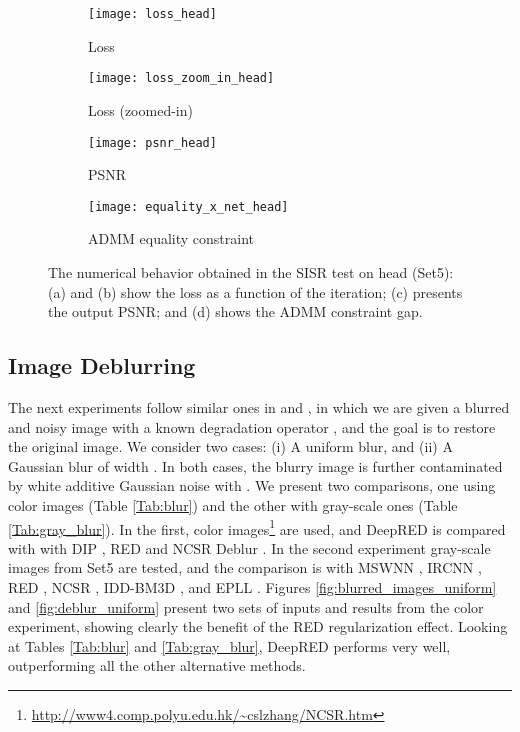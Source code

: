 \documentclass[12pt]{article}
\begin{document}
\begin{figure}[t]
\begin{subfigure}{.5\linewidth}
  \centering
  \texttt{[image: loss\_head]}
  \caption{Loss}
  \label{fig:sfig2}
\end{subfigure}
\begin{subfigure}{.5\linewidth}
  \centering
  \texttt{[image: loss\_zoom\_in\_head]}
  \caption{Loss (zoomed-in)}
  \label{fig:sfig3}
\end{subfigure}

\begin{subfigure}{.5\linewidth}
  \centering
  \texttt{[image: psnr\_head]}
  \caption{PSNR}
  \label{fig:sfig4}
\end{subfigure}
\begin{subfigure}{.5\linewidth}
  \centering
  \texttt{[image: equality\_x\_net\_head]}
  \caption{ADMM equality constraint}
  \label{fig:sfig1}
\end{subfigure}
\caption{The numerical behavior obtained in the SISR test on \textsf{head} (\textsf{Set5}): (a) and (b) show the loss as a function of the iteration; (c) presents the output PSNR; and (d) shows the ADMM constraint gap.}
\label{fig:graphs}
\end{figure}



\subsection{Image Deblurring}

The next experiments follow similar ones in \cite{RED-2017} and \cite{multi}, in which we are given a blurred and noisy image with a known degradation operator , and the goal is to restore the original image. We consider two cases: (i) A  uniform blur, and (ii) A  Gaussian blur of width . In both cases, the blurry image is further contaminated by white additive Gaussian noise with . We present two comparisons, one using color images (Table \ref{Tab:blur}) and the other with gray-scale ones (Table \ref{Tab:gray_blur}). In the first,  color images\footnote{\url{http://www4.comp.polyu.edu.hk/~cslzhang/NCSR.htm}} are used, and DeepRED is compared with with  DIP \cite{DIP-2018}, RED \cite{RED-2017} and NCSR Deblur \cite{NCSR}. In the second experiment   gray-scale images from \textsf{Set5} are tested, and the comparison is with MSWNN \cite{multi}, IRCNN \cite{IRCNN}, RED \cite{RED-2017}, NCSR \cite{NCSR}, IDD-BM3D \cite{IDD-BM3D}, and EPLL \cite{EPLL}. 
Figures \ref{fig:blurred_images_uniform} and \ref{fig:deblur_uniform} present two sets of inputs and results from the color experiment, showing clearly the benefit of the RED regularization effect. 
Looking at Tables \ref{Tab:blur} and \ref{Tab:gray_blur}, DeepRED performs very well, outperforming all the other alternative methods.
\end{document}
